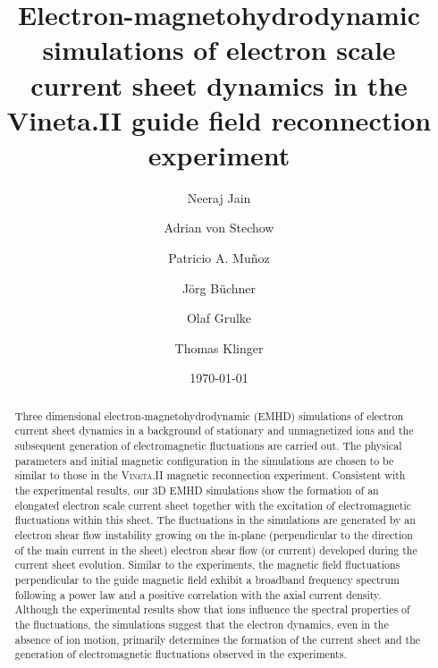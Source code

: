 \documentclass[aip,preprint]{revtex4-1}
\begin{document}

\title{Electron-magnetohydrodynamic simulations of electron scale current sheet dynamics in the Vineta.II guide field reconnection experiment}
\author{Neeraj Jain}
\author{Adrian von Stechow}
\author{Patricio A. Mu\~noz}
\author{J\"org B\"uchner}
\author{Olaf Grulke}
\author{Thomas Klinger}

\date{\today}

\begin{abstract}
Three dimensional electron-magnetohydrodynamic (EMHD) simulations of electron current sheet dynamics in a background of stationary and unmagnetized ions and the subsequent generation of electromagnetic fluctuations are carried out.
The physical parameters and initial magnetic configuration in the simulations are chosen to be similar to those in the \textsc{Vineta}.II magnetic reconnection experiment. 
Consistent with the experimental results, our 3D EMHD simulations show the formation of an elongated electron scale current sheet together with the excitation of electromagnetic fluctuations within this sheet. The fluctuations in the simulations are generated by an electron shear flow instability growing on the in-plane (perpendicular to 
the direction of the main current in the sheet) electron shear flow (or current) developed during the current sheet evolution. Similar to the experiments, the magnetic field fluctuations perpendicular to the guide magnetic field 
exhibit a broadband frequency spectrum following a power law and a   positive correlation with the axial current density. 
Although the experimental results show that ions influence the spectral properties of the fluctuations, the simulations suggest that  the electron dynamics, even in the absence of ion motion, primarily determines the formation of the current sheet and the generation of electromagnetic fluctuations observed in the experiments.
\end{abstract}
\end{document}
